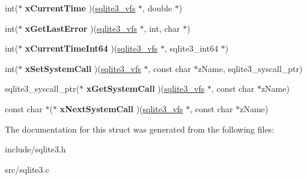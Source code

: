 \begin{DoxyCompactItemize}
\item 
\hypertarget{structsqlite3__vfs_ab85a8a3ab59f76a6685508fefaa7b691}{int($\ast$ {\bfseries x\-Current\-Time} )(\hyperlink{structsqlite3__vfs}{sqlite3\-\_\-vfs} $\ast$, double $\ast$)}\label{structsqlite3__vfs_ab85a8a3ab59f76a6685508fefaa7b691}

\item 
\hypertarget{structsqlite3__vfs_a4994110c79d082f7770ce553d507748f}{int($\ast$ {\bfseries x\-Get\-Last\-Error} )(\hyperlink{structsqlite3__vfs}{sqlite3\-\_\-vfs} $\ast$, int, char $\ast$)}\label{structsqlite3__vfs_a4994110c79d082f7770ce553d507748f}

\item 
\hypertarget{structsqlite3__vfs_aa281584c422969b7f0df0e5f918fc590}{int($\ast$ {\bfseries x\-Current\-Time\-Int64} )(\hyperlink{structsqlite3__vfs}{sqlite3\-\_\-vfs} $\ast$, sqlite3\-\_\-int64 $\ast$)}\label{structsqlite3__vfs_aa281584c422969b7f0df0e5f918fc590}

\item 
\hypertarget{structsqlite3__vfs_a69996d40229d6eabe6869bb3fc80b730}{int($\ast$ {\bfseries x\-Set\-System\-Call} )(\hyperlink{structsqlite3__vfs}{sqlite3\-\_\-vfs} $\ast$, const char $\ast$z\-Name, sqlite3\-\_\-syscall\-\_\-ptr)}\label{structsqlite3__vfs_a69996d40229d6eabe6869bb3fc80b730}

\item 
\hypertarget{structsqlite3__vfs_a604384e58c645e06b6db38d8a45e1103}{sqlite3\-\_\-syscall\-\_\-ptr($\ast$ {\bfseries x\-Get\-System\-Call} )(\hyperlink{structsqlite3__vfs}{sqlite3\-\_\-vfs} $\ast$, const char $\ast$z\-Name)}\label{structsqlite3__vfs_a604384e58c645e06b6db38d8a45e1103}

\item 
\hypertarget{structsqlite3__vfs_ac2930d34749977f39b1bbc27dc1de2b2}{const char $\ast$($\ast$ {\bfseries x\-Next\-System\-Call} )(\hyperlink{structsqlite3__vfs}{sqlite3\-\_\-vfs} $\ast$, const char $\ast$z\-Name)}\label{structsqlite3__vfs_ac2930d34749977f39b1bbc27dc1de2b2}

\end{DoxyCompactItemize}


The documentation for this struct was generated from the following files\-:\begin{DoxyCompactItemize}
\item 
include/sqlite3.\-h\item 
src/sqlite3.\-c\end{DoxyCompactItemize}
